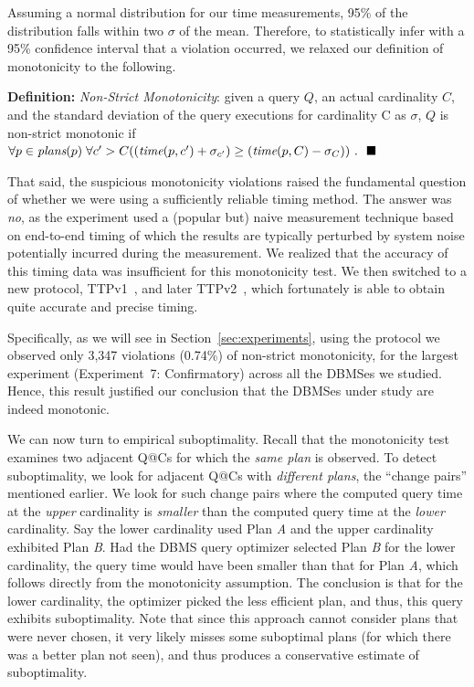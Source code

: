 \documentclass[prodmode,acmtods]{acmsmall}
\makeatletter
\def\QatC{Q{@}C}
\makeatother
\begin{document}
Assuming a normal distribution for our time measurements, 95\% of 
the distribution falls within two $\sigma$ of the mean.
Therefore, to statistically
infer with a 95\% confidence interval that a violation occurred, 
we relaxed our definition of monotonicity to the following.

\vspace{1em}\noindent
{\bf Definition:} {\em Non-Strict Monotonicity}: given a query $Q$, an actual
cardinality $C$, and the standard deviation of the query executions for
cardinality C as $\sigma$, $Q$ is non-strict monotonic if $\forall p \in
\hbox{\em plans} (p) \;\forall c^{\prime} > C ((\hbox{\em time} (p, c^{\prime}) + \sigma_{c^{\prime}}) \geq
(\hbox{\em time} (p,C) - \sigma_{C}))~.~~\hfill\blacksquare$

\vspace{1em}
That said, the suspicious monotonicity violations raised the fundamental question of whether
we were using a sufficiently reliable timing method. The answer was {\em no}, as
the experiment used a (popular but) naive measurement technique 
based on \hbox{end-to-end} timing of which the results are 
typically perturbed by system noise potentially incurred during the measurement. 
We realized that the accuracy of this timing data was
insufficient for this monotonicity test.
We then switched to a new protocol, TTPv1~\cite{TTPv1}, and later TTPv2~\cite{TTPv2},
which fortunately is able to obtain quite accurate and precise timing.

Specifically, as we will see in Section~\ref{sec:experiments}, 
using the protocol we observed only 3,347 violations (0.74\%) of non-strict monotonicity, 
for the largest experiment (Experiment~7: Confirmatory) across all
the \hbox{DBMSes} we studied. 
Hence, this result justified our conclusion that the \hbox{DBMSes} under
study are indeed monotonic.

We can now turn to empirical suboptimality. Recall that the monotonicity test examines
two adjacent {\QatC}s for which the {\em same plan} is observed. To detect
suboptimality, we look for adjacent {\QatC}s with {\em different plans}, the
``change pairs'' mentioned earlier. We look for such change pairs where the computed
query time at the {\em upper} cardinality is {\em smaller} than the computed
query time at the {\em lower} cardinality. Say the lower cardinality used
Plan {\em A} and the upper cardinality exhibited Plan {\em B}. Had the \hbox{DBMS}
query optimizer selected Plan {\em B} for the lower cardinality, the query time would have been smaller than that for
Plan {\em A}, which follows directly from the
monotonicity assumption. The conclusion is that for the lower cardinality, the
optimizer picked the less efficient plan, and thus, this query exhibits
\hbox{suboptimality}. Note that since this approach cannot consider plans
that were never chosen, it very likely misses some suboptimal plans (for
which there was a better plan not seen), and thus produces a
conservative estimate of suboptimality.
\end{document}
